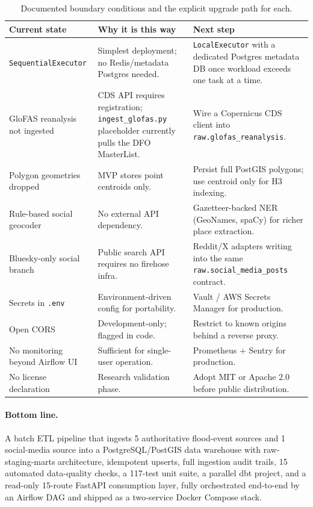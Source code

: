 \documentclass[11pt,a4paper]{article}
\begin{document}
\begin{table}[h!]
\centering
\small
\begin{tabular}{@{}p{4cm}p{5cm}p{5cm}@{}}
\toprule
\textbf{Current state} & \textbf{Why it is this way} & \textbf{Next step} \\
\midrule
\texttt{SequentialExecutor} & Simplest deployment; no Redis/metadata Postgres needed. & \texttt{LocalExecutor} with a dedicated Postgres metadata DB once workload exceeds one task at a time. \\
GloFAS reanalysis not ingested & CDS API requires registration; \texttt{ingest\_glofas.py} placeholder currently pulls the DFO MasterList. & Wire a Copernicus CDS client into \texttt{raw.glofas\_reanalysis}. \\
Polygon geometries dropped & MVP stores point centroids only. & Persist full PostGIS polygons; use centroid only for H3 indexing. \\
Rule-based social geocoder & No external API dependency. & Gazetteer-backed NER (GeoNames, spaCy) for richer place extraction. \\
Bluesky-only social branch & Public search API requires no firehose infra. & Reddit/X adapters writing into the same \texttt{raw.social\_media\_posts} contract. \\
Secrets in \texttt{.env} & Environment-driven config for portability. & Vault / AWS Secrets Manager for production. \\
Open CORS & Development-only; flagged in code. & Restrict to known origins behind a reverse proxy. \\
No monitoring beyond Airflow UI & Sufficient for single-user operation. & Prometheus + Sentry for production. \\
No license declaration & Research validation phase. & Adopt MIT or Apache 2.0 before public distribution. \\
\bottomrule
\end{tabular}
\caption{Documented boundary conditions and the explicit upgrade path
for each.}
\label{tab:limitations}
\end{table}

\paragraph{Bottom line.} A batch ETL pipeline that ingests 5 authoritative
flood-event sources and 1 social-media source into a PostgreSQL/PostGIS
data warehouse with raw-staging-marts architecture, idempotent upserts,
full ingestion audit trails, 15 automated data-quality checks, a 117-test
unit suite, a parallel dbt project, and a read-only 15-route FastAPI
consumption layer, fully orchestrated end-to-end by an Airflow DAG and
shipped as a two-service Docker Compose stack.
\end{document}
